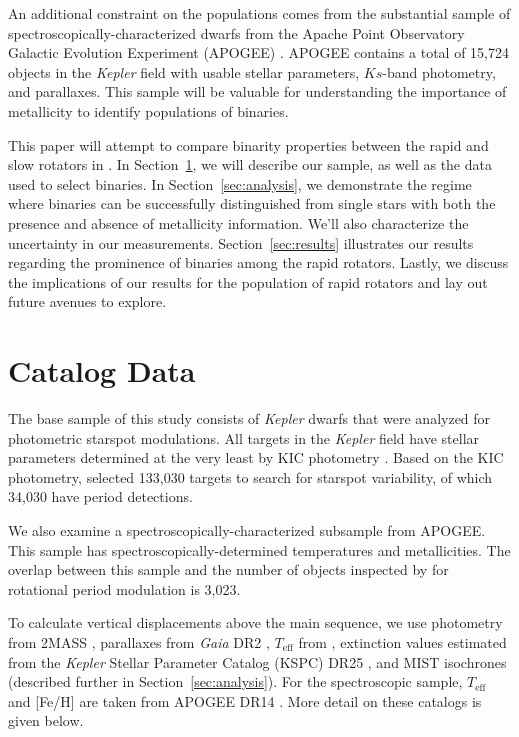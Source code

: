 \documentclass[twocolumn]{aastex6}
\newcommand{\Kepler}{\mbox{\textit{Kepler}}}
\newcommand{\Gaia}{\mbox{\textit{Gaia}}}
\newcommand{\Teff}{\ensuremath{T_{\textrm{eff}}}}
\newcommand{\feh}{\textrm{[Fe/H]}}
\begin{document}
An additional constraint on the populations comes from the substantial sample
of spectroscopically-characterized dwarfs from the Apache Point Observatory
Galactic Evolution Experiment (APOGEE) \citep{Majewski17}. APOGEE contains a 
total of 15,724 objects in the \Kepler{} field with usable stellar parameters,
\(Ks\)-band photometry, and parallaxes.  This sample will be valuable for 
understanding the importance of metallicity to identify populations of 
binaries.

This paper will attempt to compare binarity properties between the rapid and 
slow rotators in \citet{McQuillan14}. In Section~\ref{sec:data}, we will describe our 
sample, as well as the data used to select binaries. In Section~\ref{sec:analysis}, we demonstrate the regime where 
binaries can be successfully distinguished from single stars with both the 
presence and absence of metallicity information. We'll also characterize the 
uncertainty in our measurements. Section~\ref{sec:results} illustrates our 
results regarding the prominence of binaries among the rapid rotators. Lastly, 
we discuss the implications of our results for the population of rapid rotators 
and lay out future avenues to explore.

\section{Catalog Data}
\label{sec:data}

The base sample of this study consists of \Kepler{} dwarfs that were analyzed
for photometric starspot modulations. All targets in the \Kepler{} field have 
stellar parameters determined at the very least by KIC photometry 
\citep{Brown11}. Based on the KIC photometry, \citet{McQuillan14} selected 
133,030 targets to search for starspot variability, of which 34,030 have 
period detections.

We also examine a spectroscopically-characterized subsample from APOGEE\@. 
This sample has spectroscopically-determined temperatures and metallicities. 
The overlap between this sample and the number of objects inspected by 
\citet{McQuillan14} for rotational period modulation is 3,023.

To calculate vertical displacements above the main sequence, we use photometry
from 2MASS \citep{Skrutskie06}, parallaxes from \Gaia{} DR2 \citep{Gaia18},
\Teff{} from \citet{Pinsonneault12}, extinction values estimated from the 
\Kepler{} Stellar Parameter Catalog (KSPC) DR25 \citep{Huber14,Mathur17}, and
MIST isochrones \citep{Choi16} (described further in
Section~\ref{sec:analysis}). For the spectroscopic sample, \Teff{} and
\feh{} are taken from APOGEE DR14 \citep{Abolfathi18}. More detail on these 
catalogs is given below.
\end{document}
